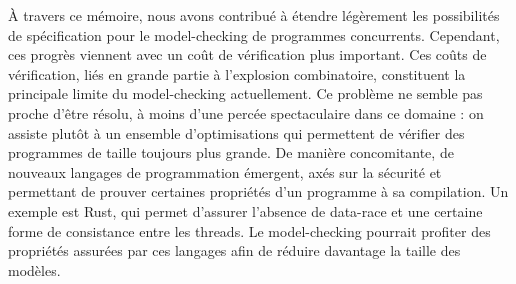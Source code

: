 À travers ce mémoire, nous avons contribué à étendre légèrement les possibilités
de spécification pour le model-checking de programmes concurrents. Cependant,
ces progrès viennent avec un coût de vérification plus important. Ces coûts de
vérification, liés en grande partie à l'explosion combinatoire, constituent la
principale limite du model-checking actuellement. Ce problème ne semble pas
proche d'être résolu, à moins d'une percée spectaculaire dans ce domaine : on
assiste plutôt à un ensemble d'optimisations qui permettent de vérifier des
programmes de taille toujours plus grande. De manière concomitante, de nouveaux
langages de programmation émergent, axés sur la sécurité et permettant de
prouver certaines propriétés d'un programme à sa compilation. Un exemple est
Rust\cite{Rust}, qui permet d'assurer l'absence de data-race et une certaine
forme de consistance entre les threads. Le model-checking pourrait profiter des
propriétés assurées par ces langages afin de réduire davantage la taille des
modèles.